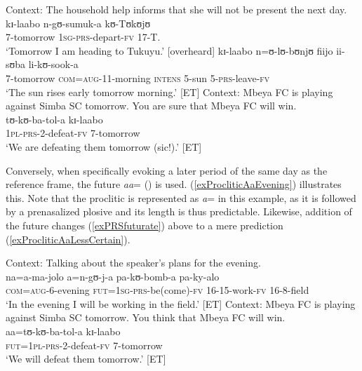 \begin{exe}
\ex \label{exPRSplanned} Context: The household help informs that she will not be present the next day.\\
\gll kɪ-laabo n-gʊ-sumuk-a kʊ-Tʊkʊjʊ\\
7-tomorrow \textsc{1sg}-\textsc{prs}-depart-\textsc{fv} 17-T.\\
\glt `Tomorrow I am heading to Tukuyu.' [overheard]
\ex \label{exPRSscheduled} \gll kɪ-laabo n=ʊ-lʊ-bʊnjʊ fiijo ii-sʊba li-kʊ-sook-a\\
7-tomorrow \textsc{com}=\textsc{aug}-11-morning \textsc{intens} 5-sun 5-\textsc{prs}-leave-\textsc{fv}\\
\glt `The sun rises early tomorrow morning.' [ET]
\ex \label{exPRSfuturate}
Context: Mbeya FC is playing against Simba SC tomorrow. You are sure that Mbeya FC will win.\\
\gll tʊ-kʊ-ba-tol-a kɪ-laabo\\
\textsc{1pl}-\textsc{prs}-2-defeat-\textsc{fv} 7-tomorrow\\
\glt \lq We are defeating them tomorrow (sic!).' [ET]
\end{exe}

Conversely, when specifically evoking a later period of the same day as the reference frame, the future  \textit{aa}= () is used. (\ref{exProcliticAaEvening}) illustrates this. Note that the proclitic is represented as \textit{a}= in this example, as it is followed by a prenasalized plosive and its length is thus predictable. Likewise, addition of the future  changes (\ref{exPRSfuturate}) above to a mere prediction (\ref{exProcliticAaLessCertain}).
\begin{exe}
\ex \label{exProcliticAaEvening}
Context: Talking about the speaker's plans for the evening.\\
\gll na=a-ma-jolo a=n-gʊ-j-a pa-kʊ-bomb-a pa-ky-alo\\
\textsc{com}=\textsc{aug}-6-evening \textsc{fut}=\textsc{1sg}-\textsc{prs}-be(come)-\textsc{fv} 16-15-work-\textsc{fv} 16-8-field\\
\glt `In the evening I will be working in the field.' [ET]
\ex \label{exProcliticAaLessCertain}
Context: Mbeya FC is playing against Simba SC tomorrow. You think that Mbeya FC will win.\\
\gll aa=tʊ-kʊ-ba-tol-a kɪ-laabo\\
\textsc{fut}=\textsc{1pl}-\textsc{prs}-2-defeat-\textsc{fv} 7-tomorrow\\
\glt \lq We will defeat them tomorrow.' [ET]
\end{exe}

